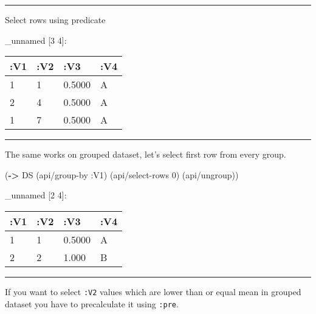 \documentclass[]{article}
\newenvironment{Shaded}{\begin{snugshade}}{\end{snugshade}}
\newcommand{\KeywordTok}[1]{\textcolor[rgb]{0.13,0.29,0.53}{\textbf{#1}}}
\newcommand{\DecValTok}[1]{\textcolor[rgb]{0.00,0.00,0.81}{#1}}
\newcommand{\VariableTok}[1]{\textcolor[rgb]{0.00,0.00,0.00}{#1}}
\newcommand{\AttributeTok}[1]{\textcolor[rgb]{0.77,0.63,0.00}{#1}}
\newcommand{\NormalTok}[1]{#1}
\begin{document}
\begin{center}\rule{0.5\linewidth}{0.5pt}\end{center}

Select rows using predicate

\begin{Shaded}
\end{Shaded}

\_unnamed {[}3 4{]}:

\begin{longtable}[]{@{}llll@{}}
\toprule
:V1 & :V2 & :V3 & :V4\tabularnewline
\midrule
\endhead
1 & 1 & 0.5000 & A\tabularnewline
2 & 4 & 0.5000 & A\tabularnewline
1 & 7 & 0.5000 & A\tabularnewline
\bottomrule
\end{longtable}

\begin{center}\rule{0.5\linewidth}{0.5pt}\end{center}

The same works on grouped dataset, let's select first row from every
group.

\begin{Shaded}
\begin{Highlighting}[]
\NormalTok{(}\KeywordTok{->}\NormalTok{ DS}
\NormalTok{    (api/group-by }\AttributeTok{:V1}\NormalTok{)}
\NormalTok{    (api/select-rows }\DecValTok{0}\NormalTok{)}
\NormalTok{    (api/ungroup))}
\end{Highlighting}
\end{Shaded}

\_unnamed {[}2 4{]}:

\begin{longtable}[]{@{}llll@{}}
\toprule
:V1 & :V2 & :V3 & :V4\tabularnewline
\midrule
\endhead
1 & 1 & 0.5000 & A\tabularnewline
2 & 2 & 1.000 & B\tabularnewline
\bottomrule
\end{longtable}

\begin{center}\rule{0.5\linewidth}{0.5pt}\end{center}

If you want to select \texttt{:V2} values which are lower than or equal
mean in grouped dataset you have to precalculate it using \texttt{:pre}.

\begin{Shaded}
\end{Shaded}
\end{document}
